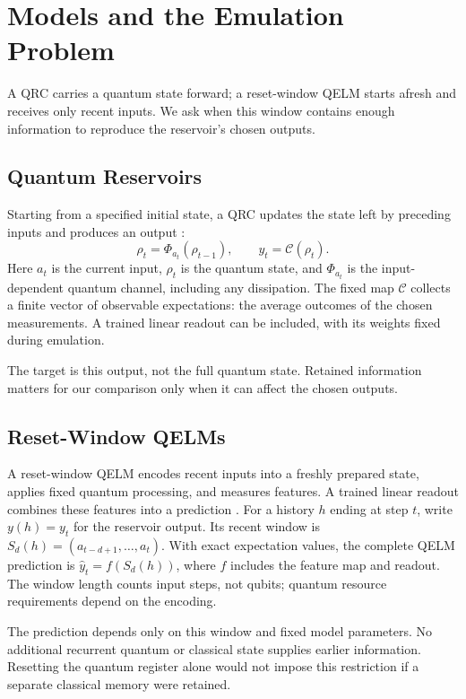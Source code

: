 \section{Models and the Emulation Problem}
\label{sec:models}

A QRC carries a quantum state forward; a reset-window QELM starts afresh
and receives only recent inputs. We ask when this window contains enough
information to reproduce the reservoir's chosen outputs.

\subsection{Quantum Reservoirs}

Starting from a specified initial state, a QRC updates the state left by
preceding inputs and produces an output
\cite{fujii2017harnessing,mujal2021opportunities}:
\[
 \rho_t=\Phi_{a_t}(\rho_{t-1}),\qquad y_t=\mathcal C(\rho_t).
\]
Here $a_t$ is the current input, $\rho_t$ is the quantum state, and
$\Phi_{a_t}$ is the input-dependent quantum channel, including any
dissipation. The fixed map $\mathcal C$ collects a finite vector of observable
expectations: the average outcomes of the chosen measurements. A trained
linear readout can be included, with its weights fixed during emulation.

The target is this output, not the full quantum state. Retained information
matters for our comparison only when it can affect the chosen outputs.

\subsection{Reset-Window QELMs}

A reset-window QELM encodes recent inputs into a freshly prepared state,
applies fixed quantum processing, and measures features. A trained linear
readout combines these features into a prediction
\cite{innocenti2023potential,kawanabe2026tdqelm}.
For a history $h$ ending at step $t$, write $y(h)=y_t$ for the reservoir
output. Its recent window is $S_d(h)=(a_{t-d+1},\ldots,a_t)$.
With exact expectation values, the complete
QELM prediction is $\widehat y_t=f(S_d(h))$, where $f$ includes the feature
map and readout. The window length counts input steps, not qubits; quantum
resource requirements depend on the encoding.

The prediction depends only on this window and fixed model parameters.
No additional recurrent quantum or classical state supplies earlier
information. Resetting the quantum register alone would not impose this
restriction if a separate classical memory were retained.

